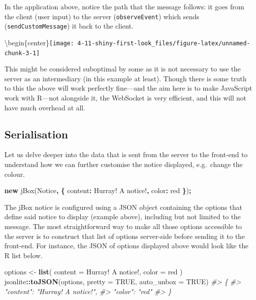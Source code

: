 \documentclass[
]{krantz}
\makeatletter
\newenvironment{Shaded}{\begin{snugshade}}{\end{snugshade}}
\newcommand{\AttributeTok}[1]{\textcolor[rgb]{0.61,0.61,0.61}{#1}}
\newcommand{\CommentTok}[1]{\textcolor[rgb]{0.37,0.37,0.37}{\textit{#1}}}
\newcommand{\DataTypeTok}[1]{\textcolor[rgb]{0.27,0.27,0.27}{#1}}
\newcommand{\KeywordTok}[1]{\textcolor[rgb]{0.27,0.27,0.27}{\textbf{#1}}}
\newcommand{\NormalTok}[1]{#1}
\newcommand{\OperatorTok}[1]{\textcolor[rgb]{0.43,0.43,0.43}{\textbf{#1}}}
\newcommand{\OtherTok}[1]{\textcolor[rgb]{0.37,0.37,0.37}{#1}}
\newcommand{\StringTok}[1]{\textcolor[rgb]{0.5,0.5,0.5}{#1}}
\newenvironment{kframe}{%
\medskip{}
\setlength{\fboxsep}{.8em}
 \def\at@end@of@kframe{}%
 \ifinner\ifhmode%
  \def\at@end@of@kframe{\end{minipage}}%
  \begin{minipage}{\columnwidth}%
 \fi\fi%
 \def\FrameCommand##1{\hskip\@totalleftmargin \hskip-\fboxsep
 \colorbox{shadecolor}{##1}\hskip-\fboxsep
     \hskip-\linewidth \hskip-\@totalleftmargin \hskip\columnwidth}%
 \MakeFramed {\advance\hsize-\width
   \@totalleftmargin\z@ \linewidth\hsize
   \@setminipage}}%
 {\par\unskip\endMakeFramed%
 \at@end@of@kframe}
\renewenvironment{Shaded}{\begin{kframe}}{\end{kframe}}
\makeatother
\begin{document}
In the application above, notice the path that the message follows: it goes from the client (user input) to the server (\texttt{observeEvent}) which sends (\texttt{sendCustomMessage}) it back to the client.

\textbackslash begin\{center\}\texttt{[image: 4-11-shiny-first-look\_files/figure-latex/unnamed-chunk-3-1]}

This might be considered suboptimal by some as it is not necessary to use the server as an intermediary (in this example at least). Though there is some truth to this the above will work perfectly fine---and the aim here is to make JavaScript work with R---not alongside it, the WebSocket is very efficient, and this will not have much overhead at all.

\hypertarget{shiny-intro-serialise}{%
\subsection{Serialisation}\label{shiny-intro-serialise}}

Let us delve deeper into the data that is sent from the server to the front-end to understand how we can further customise the notice displayed, e.g.~change the colour.

\begin{Shaded}
\begin{Highlighting}[]
\KeywordTok{new} \AttributeTok{jBox}\NormalTok{(}\StringTok{\textquotesingle{}Notice\textquotesingle{}}\OperatorTok{,} \OperatorTok{\{}
  \DataTypeTok{content}\OperatorTok{:} \StringTok{\textquotesingle{}Hurray! A notice!\textquotesingle{}}\OperatorTok{,}
  \DataTypeTok{color}\OperatorTok{:} \StringTok{\textquotesingle{}red\textquotesingle{}}
\OperatorTok{\}}\NormalTok{)}\OperatorTok{;}
\end{Highlighting}
\end{Shaded}

The jBox notice is configured using a JSON object containing the options that define said notice to display (example above), including but not limited to the message. The most straightforward way to make all those options accessible to the server is to construct that list of options server-side before sending it to the front-end. For instance, the JSON of options displayed above would look like the R list below.

\begin{Shaded}
\begin{Highlighting}[]
\NormalTok{options <{-}}\StringTok{ }\KeywordTok{list}\NormalTok{(}
  \DataTypeTok{content =} \StringTok{\textquotesingle{}Hurray! A notice!\textquotesingle{}}\NormalTok{,}
  \DataTypeTok{color =} \StringTok{\textquotesingle{}red\textquotesingle{}}
\NormalTok{)}
\NormalTok{jsonlite}\OperatorTok{::}\KeywordTok{toJSON}\NormalTok{(options, }\DataTypeTok{pretty =} \OtherTok{TRUE}\NormalTok{, }\DataTypeTok{auto\_unbox =} \OtherTok{TRUE}\NormalTok{)}
\CommentTok{\#> \{}
\CommentTok{\#>   "content": "Hurray! A notice!",}
\CommentTok{\#>   "color": "red"}
\CommentTok{\#> \}}
\end{Highlighting}
\end{Shaded}
\end{document}
